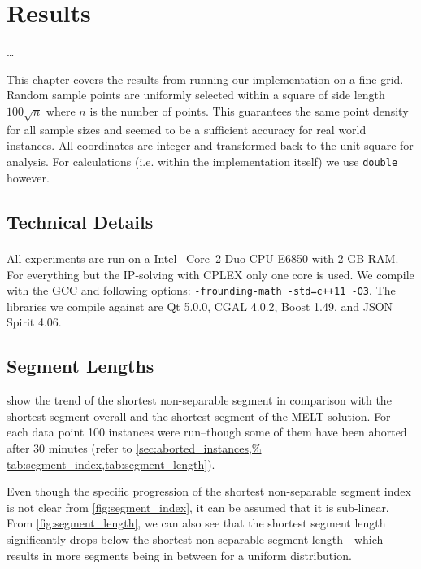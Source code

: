 \chapter{Results}
\label{cha:results}

\ldots{}

This chapter covers the results from running our implementation on a
fine grid. Random sample points are uniformly selected within a
square of side length \(100 \sqrt{n}\) where \(n\) is the number of
points. This guarantees the same point density for all sample sizes
and seemed to be a sufficient accuracy for real world instances.
All coordinates are integer and transformed back to the unit
square for analysis. For calculations (i.e. within the implementation
itself) we use \verb|double| however.

\section{Technical Details}
All experiments are run on a Intel\textsuperscript{\textregistered}~%
Core\texttrademark~2 Duo CPU E6850 with 2 GB RAM. For everything but
the IP-solving with CPLEX only one core is used. We compile with the
GCC and following options: \verb|-frounding-math -std=c++11 -O3|. The
libraries we compile against are Qt 5.0.0, CGAL 4.0.2, Boost 1.49,
and JSON Spirit 4.06.

\section{Segment Lengths}
\label{sec:results_segments}
 show the trend of
the shortest non-separable segment in comparison with the shortest
segment overall and the shortest segment of the \gls{MELT} solution.
For each data point 100 instances were run--though some of them have
been aborted after 30 minutes (refer to \cref{sec:aborted_instances,%
tab:segment_index,tab:segment_length}).

Even though the specific progression of the shortest non-separable
segment index is not clear from \cref{fig:segment_index}, it can be
assumed that it is sub-linear. From \cref{fig:segment_length}, we can
also see that the shortest segment length significantly drops below
the shortest non-separable segment length---which results in more
segments being in between for a uniform distribution.

